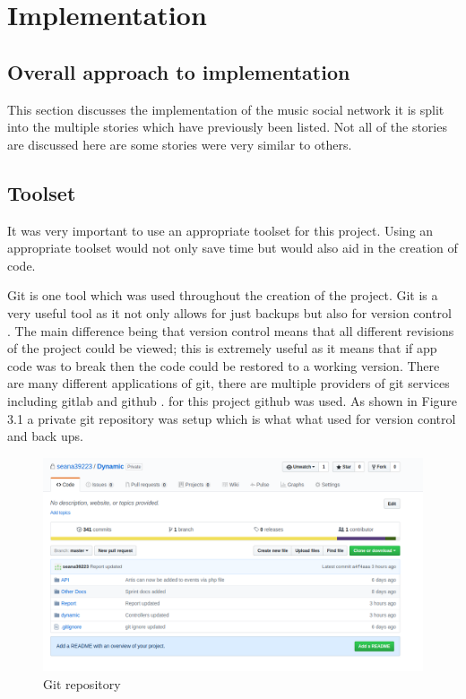 \chapter{Implementation}
\section{Overall approach to implementation}
This section discusses the implementation of the music social network it is split into the multiple stories which have previously been listed. Not all of the stories are discussed here are some stories were very similar to others.

\section{Toolset}
It was very important to use an appropriate toolset for this project. Using an appropriate toolset would not only save time but would also aid in the creation of code.

Git is one tool which was used throughout the creation of the project. Git is a very useful tool as it not only allows for just backups but also for version control \cite{git}. The main difference being that version control means that all different revisions of the project could be viewed; this is extremely useful as it means that if app code was to break then the code could be restored to a working version. There are many different applications of git, there are multiple providers of git services including gitlab and github \cite{github} \cite{gitlab}. for this project github was used. As shown in Figure 3.1 a private git repository was setup which is what what used for version control and back ups.
\begin{center} 
\begin{figure}[H]
\includegraphics[scale=0.3]{images/git}
\caption{Git repository}
\end{figure}
\end{center}

